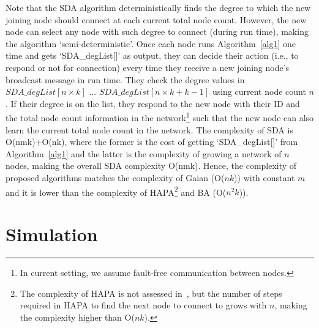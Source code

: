 \documentclass[10pt,journal,cspaper,compsoc]{IEEEtran}
\begin{document}
Note that the SDA algorithm deterministically finds the degree to which the new joining node should connect at each current total node count. However, the new node can select any node with such degree to connect (during run time), making the algorithm `semi-deterministic'. Once each node runs Algorithm~\ref{alg1} one time and gets `SDA\_degList[]' as output, they can decide their action (i.e., to respond or not for connection) every time they receive a new joining node's broadcast message in run time. They check the degree values in $SDA\_degList[n\times k]$ $\ldots$ $SDA\_degList[n\times k+k-1]$ using current node count $n$. If their degree is on the list, they respond to the new node with their ID and the total node count information in the network\footnote{In current setting, we assume fault-free communication between nodes.} such that the new node can also learn the current total node count in the network. The complexity of SDA is O(nmk)+O(nk), where the former is the cost of getting `SDA\_degList[]' from Algorithm~\ref{alg1} and the latter is the complexity of growing a network of $n$ nodes, making the overall SDA complexity O(nmk). Hence, the complexity of proposed algorithms matches the complexity of Gaian (O($nk$)) with constant $m$ and it is lower than the complexity of HAPA\footnote{The complexity of HAPA is not assessed in~\cite{guclu}, but the number of steps required in HAPA to find the next node to connect to grows with $n$, making the complexity higher than O($nk$).} and BA (O($n^2k$)).








\section{Simulation}
\label{sec:simulation}
\end{document}
